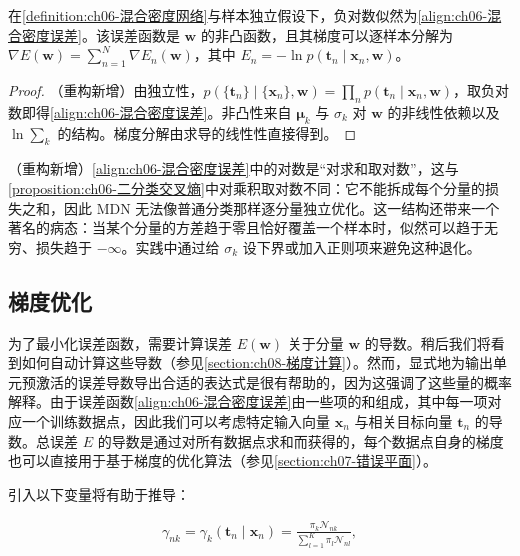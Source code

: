 \documentclass[../../main.tex]{subfiles}
\begin{document}
\begin{proposition}\label{proposition:ch06-MDN误差}
在\cref{definition:ch06-混合密度网络}与样本独立假设下，负对数似然为\eqref{align:ch06-混合密度误差}。该误差函数是 $\boldsymbol{w}$ 的非凸函数，且其梯度可以逐样本分解为 $\nabla E(\boldsymbol{w})=\sum_{n=1}^{N}\nabla E_n(\boldsymbol{w})$，其中 $E_n=-\ln p(\boldsymbol{t}_n\mid\boldsymbol{x}_n,\boldsymbol{w})$。
\end{proposition}

\begin{proof}
（重构新增）由独立性，$p(\{\boldsymbol{t}_n\}\mid\{\boldsymbol{x}_n\},\boldsymbol{w})=\prod_{n}p(\boldsymbol{t}_n\mid\boldsymbol{x}_n,\boldsymbol{w})$，取负对数即得\eqref{align:ch06-混合密度误差}。非凸性来自 $\boldsymbol{\mu}_k$ 与 $\sigma_k$ 对 $\boldsymbol{w}$ 的非线性依赖以及 $\ln\sum_k$ 的结构。梯度分解由求导的线性性直接得到。
\end{proof}

\begin{remark}（重构新增）\eqref{align:ch06-混合密度误差}中的对数是“对求和取对数”，这与\cref{proposition:ch06-二分类交叉熵}中对乘积取对数不同：它不能拆成每个分量的损失之和，因此 MDN 无法像普通分类那样逐分量独立优化。这一结构还带来一个著名的病态：当某个分量的方差趋于零且恰好覆盖一个样本时，似然可以趋于无穷、损失趋于 $-\infty$。实践中通过给 $\sigma_k$ 设下界或加入正则项来避免这种退化。
\end{remark}

\subsection{梯度优化}\label{subsection:ch06-梯度优化}

为了最小化误差函数，需要计算误差 $E(\boldsymbol{w})$ 关于分量 $\boldsymbol{w}$ 的导数。稍后我们将看到如何自动计算这些导数（参见\cref{section:ch08-梯度计算}）。然而，显式地为输出单元预激活的误差导数导出合适的表达式是很有帮助的，因为这强调了这些量的概率解释。由于误差函数\eqref{align:ch06-混合密度误差}由一些项的和组成，其中每一项对应一个训练数据点，因此我们可以考虑特定输入向量 $\boldsymbol{x}_n$ 与相关目标向量 $\boldsymbol{t}_n$ 的导数。总误差 $E$ 的导数是通过对所有数据点求和而获得的，每个数据点自身的梯度也可以直接用于基于梯度的优化算法（参见\cref{section:ch07-错误平面}）。

引入以下变量将有助于推导：

\begin{align}
\gamma_{nk}=\gamma_k(\boldsymbol{t}_n\mid\boldsymbol{x}_n)=\frac{\pi_k\mathcal{N}_{nk}}{\sum_{l=1}^{K}\pi_l\mathcal{N}_{nl}},
\label{align:ch06-分量后验}
\end{align}
\end{document}
